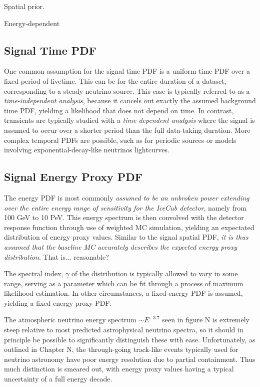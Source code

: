 Spatial prior.

Energy-dependent

\subsection{Signal Time PDF}

One common assumption for the signal time PDF is a uniform time PDF over a fixed period of livetime. This can be for the entire duration of a dataset, corresponding to a steady neutrino source. This case is typically referred to as a \emph{time-independent analysis}, because it cancels out exactly the assumed background time PDF, yielding a likelihood that does not depend on time. In contrast, transients are typically studied with a \emph{time-dependent analysis} where the signal is assumed to occur over a shorter period than the full data-taking duration. More complex temporal PDFs are possible, such as for periodic sources or models involving exponential-decay-like neutrinos lightcurves.

\subsection{Signal Energy Proxy PDF}

The energy PDF is most commonly \emph{assumed to be an unbroken power extending over the entire energy range of sensitivity for the IceCub detector}, namely from 100 GeV to 10 PeV. This energy spectrum is then convolved with the detector response function through use of weighted MC simulation, yielding an expectated distribution of energy proxy values. Similar to the signal spatial PDF, \emph{it is thus assumed that the baseline MC accurately describes the expected energy proxy distribution}. That is... reasonable?

The spectral index, $\gamma$ of the distribution is typically allowed to vary in some range, serving as a parameter which can be fit through a process of maximum likelihood estimation. In other circumstances, a fixed energy PDF is assumed, yielding a fixed energy proxy PDF.

The atmospheric neutrino energy spectrum $\sim E^{-3.7}$ seen in figure N is extremely steep relative to most predicted astrophysical neutrino spectra, so it should in principle be possible to significantly distinguish these with ease. Unfortunately, as outlined in Chapter N, the through-going track-like events typically used for neutrino astronomy have poor energy resolution due to partial containment. Thus much distinction is smeared out, with energy proxy values having a typical uncertainty of a full energy decade.

